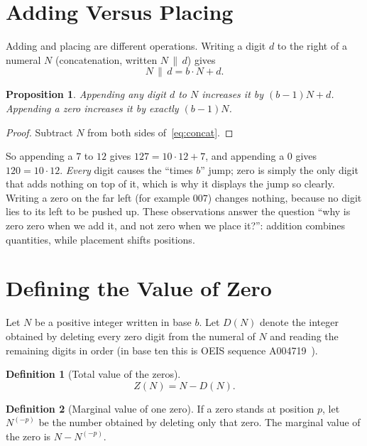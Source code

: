 \documentclass[11pt,a4paper]{article}
\newtheorem{proposition}{Proposition}
\theoremstyle{definition}
\newtheorem{definition}{Definition}
\newcommand{\Dz}{D}   %
\newcommand{\Zv}{Z}   %
\begin{document}
\section{Adding Versus Placing}\label{sec:placing}

Adding and placing are different operations. Writing a digit $d$ to the right of a numeral $N$ (concatenation, written $N\,\|\,d$) gives
\begin{equation}\label{eq:concat}
  N\,\|\,d = b\cdot N + d .
\end{equation}

\begin{proposition}
Appending any digit $d$ to $N$ increases it by $(b-1)N+d$. Appending a zero increases it by exactly $(b-1)N$.
\end{proposition}
\begin{proof}
Subtract $N$ from both sides of~\eqref{eq:concat}.
\end{proof}

So appending a $7$ to $12$ gives $127=10\cdot 12+7$, and appending a $0$ gives $120=10\cdot 12$. \emph{Every} digit causes the ``times $b$'' jump; zero is simply the only digit that adds nothing on top of it, which is why it displays the jump so clearly. Writing a zero on the far left (for example $007$) changes nothing, because no digit lies to its left to be pushed up. These observations answer the question ``why is zero zero when we add it, and not zero when we place it?'': addition combines quantities, while placement shifts positions.

\section{Defining the Value of Zero}\label{sec:def}

Let $N$ be a positive integer written in base $b$. Let $\Dz(N)$ denote the integer obtained by deleting every zero digit from the numeral of $N$ and reading the remaining digits in order (in base ten this is OEIS sequence A004719~\cite{oeis}).

\begin{definition}[Total value of the zeros]
\begin{equation}\label{eq:def}
  \Zv(N) = N - \Dz(N).
\end{equation}
\end{definition}

\begin{definition}[Marginal value of one zero]
If a zero stands at position $p$, let $N^{(-p)}$ be the number obtained by deleting only that zero. The marginal value of the zero is $N - N^{(-p)}$.
\end{definition}
\end{document}
